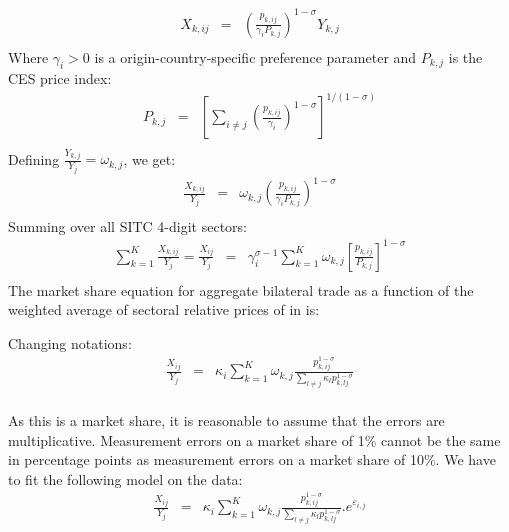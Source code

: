 \documentclass[12pt,twoside,a4paper,notitlepage]{article}
\begin{document}
\[\begin{array}{*{35}{l}}
   {{X}_{k,ij}} & = & {{\left( \frac{{{p}_{k,ij}}}{{{\gamma }_{i}}{{P}_{k,j}}} \right)}^{1-\sigma }}{{Y}_{k,j}}  \\
\end{array}\]
Where ${{\gamma }_{i}}>0$ is a origin-country-specific preference parameter and ${{P}_{k,j}}$ is the CES price index:
\[\begin{array}{*{35}{l}}
   {{P}_{k,j}} & = & {{\left[ \sum\limits_{i\ne j}{{{\left( \frac{{{p}_{k,ij}}}{{{\gamma }_{i}}} \right)}^{1-\sigma }}} \right]}^{1/(1-\sigma )}}  \\
\end{array}\]
  Defining $\frac{{{Y}_{k,j}}}{{{Y}_{j}}}={{\omega }_{k,j}}$, we get: 
\[\begin{array}{*{35}{l}}
   \frac{{{X}_{k,ij}}}{{{Y}_{j}}} & = & {{\omega }_{k,j}}{{\left( \frac{{{p}_{k,ij}}}{{{\gamma }_{i}}{{P}_{k,j}}} \right)}^{1-\sigma }}  \\
\end{array}\]
 Summing over all SITC 4-digit sectors: 
\[\begin{array}{*{35}{l}}
   \sum\limits_{k=1}^{K}{\frac{{{X}_{k,ij}}}{{{Y}_{j}}}}=\frac{{{X}_{ij}}}{{{Y}_{j}}} & = & \gamma _{i}^{\sigma -1}\sum\limits_{k=1}^{K}{{{\omega }_{k,j}}}{{\left[ \frac{{{p}_{k,ij}}}{{{P}_{k,j}}} \right]}^{1-\sigma }}  \\
\end{array}\]
The market share equation for aggregate bilateral trade as a function of the weighted average of sectoral relative prices of  in  is: 

	 
 Changing notations:
\begin{eqnarray}
   \frac{{{X}_{ij}}}{{{Y}_{j}}} & = & {{\kappa }_{i}}\sum\limits_{k=1}^{K}{{{\omega }_{k,j}}}\frac{p_{k,ij}^{1-\sigma }}{\sum\limits_{l\ne j}{{{\kappa }_{l}}}p_{k,lj}^{1-\sigma }}  \\
\end{eqnarray}

As this is a market share, it is reasonable to assume that the errors are multiplicative. Measurement errors on a market share of 1\% cannot be the same in percentage points as measurement errors on a market share of 10\%.
We have to fit the following model on the data:
\begin{eqnarray}
   \frac{{{X}_{ij}}}{{{Y}_{j}}} & = & {{\kappa }_{i}}\sum\limits_{k=1}^{K}{{{\omega }_{k,j}}}\frac{p_{k,ij}^{1-\sigma }}{\sum\limits_{l\ne j}{{{\kappa }_{l}}}p_{k,lj}^{1-\sigma }}.{{e}^{{{\varepsilon }_{i,j}}}}
  \end{eqnarray}
\end{document}
